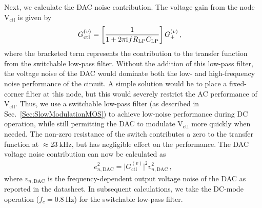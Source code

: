 \documentclass[aip,rsi,reprint]{revtex4-1} %
\newcommand{\iu}{\mathrm{i}\mkern1mu}
\begin{document}
Next, we calculate the DAC noise contribution.
The voltage gain from the node $\text{V}_{\text{ctl}}$ is given by
\begin{align}
\label{Eq:Gdc}
G^{(v)}_{\text{ctl}} &= \left[\frac{1}{1+2\pi \iu f R_\text{LP} C_\text{LP}}\right]G_{+}^{(v)}\,,
\end{align}
where the bracketed term represents the contribution to the transfer function from the switchable low-pass filter.
Without the addition of this low-pass filter, the voltage noise of the DAC would dominate both the low- and high-frequency noise performance of the circuit.
A simple solution would be to place a fixed-corner filter at this node, but this would severely restrict the AC performance of $\text{V}_\text{ctl}$.
Thus, we use a switchable low-pass filter (as described in Sec.~\ref{Sec:SlowModulationMOS}) to achieve low-noise performance during DC operation, while still permitting the DAC to modulate $\text{V}_\text{ctl}$ more quickly when needed.
The non-zero resistance of the switch contributes a zero to the transfer function at $\approx\SI{23}{\kilo\hertz}$, but has negligible effect on the performance.
The DAC voltage noise contribution can now be calculated as 
\begin{align}
e^2_{n,\text{DAC}} = \big|G^{(v)}_{\text{ctl}}\big|^2 v^2_{n,\text{DAC}}\,,
\end{align}
where $v_{n,\text{DAC}}$ is the frequency-dependent output voltage noise of the DAC as reported in the datasheet.\cite{AD56XXRDatasheet} 
In subsequent calculations, we take the DC-mode operation ($f_c = \SI{0.8}{\hertz}$) for the switchable low-pass filter.
 
\end{document}
